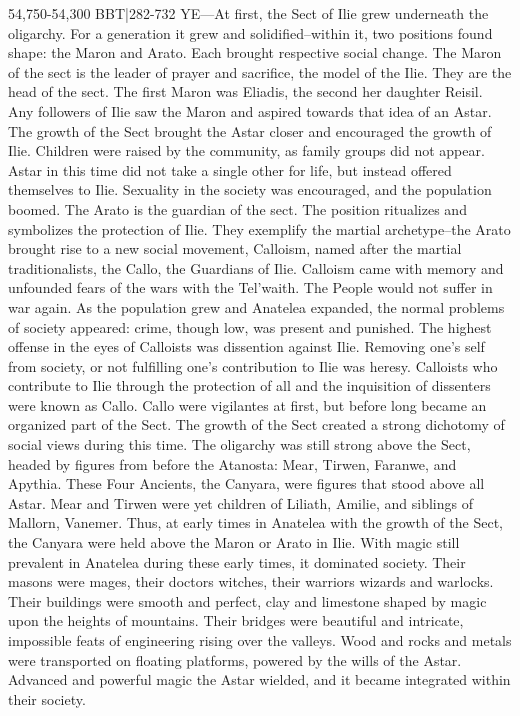 \documentclass[smalldemyvopaper,11pt,twoside,onecolumn,openright,extrafontsizes]{memoir}
\begin{document}
54,750-54,300 BBT|282-732 YE—At first, the Sect of Ilie grew underneath the oligarchy. For a generation it grew and solidified--within it, two positions found shape: the Maron and Arato. Each brought respective social change. The Maron of the sect is the leader of prayer and sacrifice, the model of the Ilie. They are the head of the sect. The first Maron was Eliadis, the second her daughter Reisil. Any followers of Ilie saw the Maron and aspired towards that idea of an Astar. The growth of the Sect brought the Astar closer and encouraged the growth of Ilie. Children were raised by the community, as family groups did not appear. Astar in this time did not take a single other for life, but instead offered themselves to Ilie. Sexuality in the society was encouraged, and the population boomed.
	The Arato is the guardian of the sect. The position ritualizes and symbolizes the protection of Ilie. They exemplify the martial archetype--the Arato brought rise to a new social movement, Calloism, named after the martial traditionalists, the Callo, the Guardians of Ilie. Calloism came with memory and unfounded fears of the wars with the Tel'waith. The People would not suffer in war again. As the population grew and Anatelea expanded, the normal problems of society appeared: crime, though low, was present and punished. The highest offense in the eyes of Calloists was dissention against Ilie. Removing one’s self from society, or not fulfilling one’s contribution to Ilie was heresy. Calloists who contribute to Ilie through the protection of all and the inquisition of dissenters were known as Callo. Callo were vigilantes at first, but before long became an organized part of the Sect.
	The growth of the Sect created a strong dichotomy of social views during this time. The oligarchy was still strong above the Sect, headed by figures from before the Atanosta: Mear, Tirwen, Faranwe, and Apythia. These Four Ancients, the Canyara, were figures that stood above all Astar. Mear and Tirwen were yet children of Liliath, Amilie, and siblings of Mallorn, Vanemer. Thus, at early times in Anatelea with the growth of the Sect, the Canyara were held above the Maron or Arato in Ilie.
	With magic still prevalent in Anatelea during these early times, it dominated society. Their masons were mages, their doctors witches, their warriors wizards and warlocks. Their buildings were smooth and perfect, clay and limestone shaped by magic upon the heights of mountains. Their bridges were beautiful and intricate, impossible feats of engineering rising over the valleys. Wood and rocks and metals were transported on floating platforms, powered by the wills of the Astar. Advanced and powerful magic the Astar wielded, and it became integrated within their society.
\end{document}
